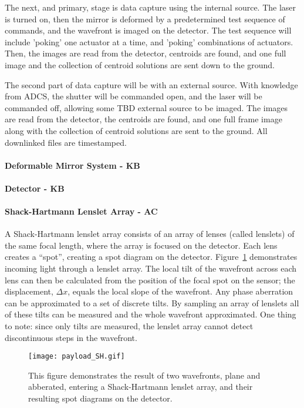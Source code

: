 \documentclass[12pt]{article}
\begin{document}
The next, and primary, stage is data capture using the internal source. The laser is turned on, then the mirror is deformed by a predetermined test sequence of commands, and the wavefront is imaged on the detector. The test sequence will include 'poking' one actuator at a time, and 'poking' combinations of actuators. Then, the images are read from the detector, centroids are found, and one full image and the collection of centroid solutions are sent down to the ground.

The second part of data capture will be with an external source. With knowledge from ADCS, the shutter will be commanded open, and the laser will be commanded off, allowing some TBD external source to be imaged. The images are read from the detector, the centroids are found, and one full frame image along with the collection of centroid solutions are sent to the ground. All downlinked files are timestamped.

\paragraph{Deformable Mirror System - KB}

\paragraph{Detector - KB}

\paragraph{Shack-Hartmann Lenslet Array - AC}

A Shack-Hartmann lenslet array consists of an array of lenses (called lenslets) of the same focal length, where the array is focused on the detector. Each lens creates a “spot”, creating a spot diagram on the detector. Figure~\ref{fig:lenslet_array} demonstrates incoming light through a lenslet array. The local tilt of the wavefront across each lens can then be calculated from the position of the focal spot on the sensor; the displacement, $\Delta x$, equals the local slope of the wavefront. Any phase aberration can be approximated to a set of discrete tilts. By sampling an array of lenslets all of these tilts can be measured and the whole wavefront approximated. One thing to note: since only tilts are measured, the lenslet array cannot detect discontinuous steps in the wavefront.

\begin{figure}[ht]
\centering
  \texttt{[image: payload\_SH.gif]}
\caption{This figure demonstrates the result of two wavefronts, plane and abberated, entering a Shack-Hartmann lenslet array, and their resulting spot diagrams on the detector.}
\label{fig:lenslet_array}
\end{figure}
\end{document}
